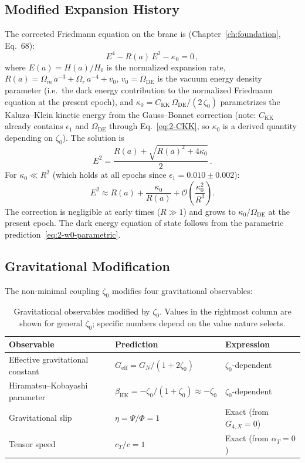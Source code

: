 \subsection{Modified Expansion History}
\label{sec:2-expansion}

The corrected Friedmann equation on the brane is (Chapter~\ref{ch:foundation}, Eq.~68):
\begin{equation}
E^4 - R(a)\,E^2 - \kappa_0 = 0\,,
\label{eq:2-Friedmann}
\end{equation}
where $E(a) = H(a)/H_0$ is the normalized expansion rate, $R(a) = \Omega_m\,a^{-3} + \Omega_r\,a^{-4} + v_0$, $v_0 = \Omega_\mathrm{DE}$ is the vacuum energy density parameter (i.e.\ the dark energy contribution to the normalized Friedmann equation at the present epoch), and $\kappa_0 = C_\mathrm{KK}\,\Omega_\mathrm{DE}/(2\,\zeta_0)$ parametrizes the Kaluza--Klein kinetic energy from the Gauss--Bonnet correction (note: $C_\mathrm{KK}$ already contains $\epsilon_1$ and $\Omega_\mathrm{DE}$ through Eq.~\eqref{eq:2-CKK}, so $\kappa_0$ is a derived quantity depending on $\zeta_0$). The solution is
\begin{equation}
E^2 = \frac{R(a) + \sqrt{R(a)^2 + 4\kappa_0}}{2}\,.
\label{eq:2-Esolution}
\end{equation}
For $\kappa_0 \ll R^2$ (which holds at all epochs since $\epsilon_1 = 0.010 \pm 0.002$):
\begin{equation}
E^2 \approx R(a) + \frac{\kappa_0}{R(a)} + \mathcal{O}\!\left(\frac{\kappa_0^2}{R^3}\right).
\label{eq:2-Eapprox}
\end{equation}
The correction is negligible at early times ($R \gg 1$) and grows to $\kappa_0/\Omega_\mathrm{DE}$ at the present epoch. The dark energy equation of state follows from the parametric prediction~\eqref{eq:2-w0-parametric}.

\subsection{Gravitational Modification}
\label{sec:2-gravity}

The non-minimal coupling $\zeta_0$ modifies four gravitational observables:

\begin{table}[htbp]
\centering
\caption{Gravitational observables modified by $\zeta_0$. Values in the rightmost column are shown for general $\zeta_0$; specific numbers depend on the value nature selects.}
\label{tab:2-gravity}
\begin{tabular}{lll}
\toprule
Observable & Prediction & Expression \\
\midrule
Effective gravitational constant & $G_\mathrm{eff} = G_N/(1 + 2\zeta_0)$ & $\zeta_0$-dependent \\
Hiramatsu--Kobayashi parameter & $\beta_\mathrm{HK} = -\zeta_0/(1+\zeta_0) \approx -\zeta_0$ & $\zeta_0$-dependent \\
Gravitational slip & $\eta = \Psi/\Phi = 1$ & Exact (from $G_{4,X} = 0$) \\
Tensor speed & $c_T/c = 1$ & Exact (from $\alpha_T = 0$) \\
\bottomrule
\end{tabular}
\end{table}


